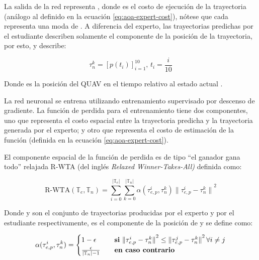 La salida de la red representa , donde  es el costo de ejecución de la trayectoria  (análogo al definido en la ecuación \ref{eq:aoa-expert-cost}), nótese que cada  representa una moda de . A diferencia del experto, las trayectorias predichas por el estudiante describen solamente el componente de la posición de la trayectoria, por esto,  y describe:

\begin{equation}
\label{eq:aoa-network-taun}
    \tau_{n}^{k} = {[p(t_i)]}_{i = 1}^{10}, \, t_i = \frac{i}{10}
\end{equation}

Donde  es la posición del QUAV en el tiempo  relativo al estado actual .

La red neuronal se entrena utilizando entrenamiento supervisado por descenso de gradiente. La función de perdida para el entrenamiento tiene dos componentes, uno que representa el costo espacial entre la trayectoria predicha y la trayectoria generada por el experto; y otro que representa el costo de estimación de la función  (definida en la ecuación \ref{eq:aoa-expert-cost}).

El componente espacial de la función de perdida es de tipo ``el ganador gana todo'' relajada R-WTA (del inglés \textit{Relaxed Winner-Takes-All)} definida como:

\begin{equation}
\label{eq:aoa-student-spacial-loss}
    \text{R-WTA}(\mathbb{T}_e, \mathbb{T}_n) = \sum_{i=0}^{|\mathbb{T}_e|} \sum_{k=0}^{|\mathbb{T}_n|} \alpha(\tau_{e,p}^{i}, \tau_{n}^{k}) {\|\tau_{e,p}^{i} - \tau_{n}^{k}\|}^2
\end{equation}

Donde  y  son el conjunto de trayectorias producidas por el experto y por el estudiante respectivamente,  es el componente de la posición de  y  se define como:

\begin{equation}
\label{eq:aoa-student-spacial-alpha}
    \alpha(\tau_{e,p}^{i}, \tau_{n}^{k}) = \begin{cases}
        1 - \epsilon                            & \quad\text{\textbf{si} } {\|\tau_{e,p}^{i} - \tau_{n}^{k}\|}^2 \leq {\|\tau_{e,p}^{j} - \tau_{n}^{k}\|}^2 \, \forall i \ne j \\
        \frac{\epsilon}{|\mathbb{T}_n| - 1}     & \quad\text{\textbf{en caso contrario}}
    \end{cases}
\end{equation}


